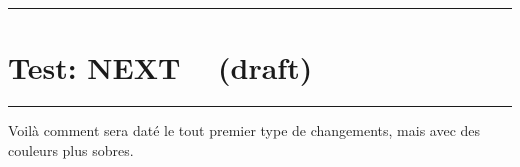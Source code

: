 \documentclass{tutodoc}
\newcommand\docyear {2023}
\newcommand\docmonth{04}
\newcommand\docday  {29}
\renewcommand\docday{0}
\newcommand\when{NEXT ~ (draft)}
\newcommand\filepath{next}
\newcommand\when{\docyear-\docmonth-\docday}
\newcommand\filepath{\docyear/\docmonth/\docday}
\begin{document}
\bgroup
    \color{red!75!black}
    \rule\linewidth{1pt}

    \vspace{-1em}
    \section*{\color{red!75!black} Test: \when}

    \vspace{-.75em}
    \rule\linewidth{1pt}
\egroup


\small

\bigskip

\begin{tdoctodo}[
    col       = ForestGreen,
    col-chges = Goldenrod,
    date      = 5678-90-12,
    version   = 1.2.3-rc.4
]
    \item Voilà comment sera daté le tout premier type de changements, mais avec des couleurs plus sobres.
\end{tdoctodo}



\end{document}
